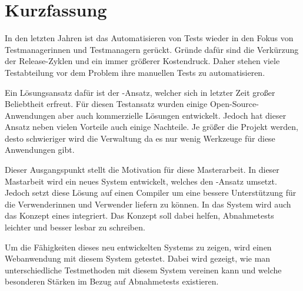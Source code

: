 \chapter{Kurzfassung}

In den letzten Jahren ist das Automatisieren von Tests wieder in den Fokus von Testmanagerinnen und Testmanagern gerückt. Gründe dafür sind die Verkürzung der Release-Zyklen und ein immer größerer Kostendruck. Daher stehen viele Testabteilung vor dem Problem ihre manuellen Tests zu automatisieren.

\SuperPar
Ein Lösungsansatz dafür ist der -Ansatz, welcher sich in letzter Zeit großer Beliebtheit erfreut. Für diesen Testansatz wurden einige Open-Source-Anwendungen aber auch kommerzielle Lösungen entwickelt. Jedoch hat dieser Ansatz neben vielen Vorteile auch einige Nachteile. Je größer die Projekt werden, desto schwieriger wird die Verwaltung da es nur wenig Werkzeuge für diese Anwendungen gibt. 

\SuperPar
Dieser Ausgangspunkt stellt die Motivation für diese Masterarbeit. In dieser Mastarbeit wird ein neues System entwickelt, welches den -Ansatz umsetzt. Jedoch setzt diese Lösung auf einen Compiler um eine bessere Unterstützung für die Verwenderinnen und Verwender liefern zu können. In das System wird auch das Konzept eines  integriert. Das Konzept soll dabei helfen, Abnahmetests leichter und besser lesbar zu schreiben.

\SuperPar
Um die Fähigkeiten dieses neu entwickelten Systems zu zeigen, wird einen Webanwendung mit diesem System getestet. Dabei wird gezeigt, wie man unterschiedliche Testmethoden mit diesem System vereinen kann und welche besonderen Stärken im Bezug auf Abnahmetests existieren.